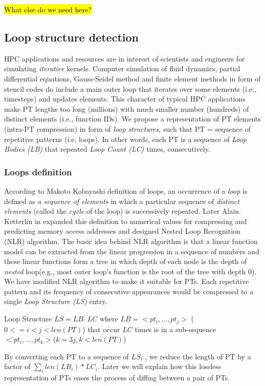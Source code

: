 \hl{What else do we need here?}

\subsection{Loop structure detection}
\label{subsec:nlr}

HPC applications and resources are in interest of scientists and engineers for simulating \textit{iterative} kernels. Computer simulation of fluid dynamics, partial differential equations, Gauss-Seidel method and finite element methods in form of stencil codes do include a main outer loop that iterates over some elements (i.e., timesteps) and updates elements.
%
This character of typical HPC applications make PT lengths too long (millions) with much smaller number (hundreds) of distinct elements  (i.e., function IDs).
%
We propose a representation of PT elements (intra-PT compression) in form of \textit{loop structures}, such that PT = sequence of repetitive patterns (i.e, loops). In other words, each PT is a sequence of \textit{Loop Bodies (LB)} that repeated \textit{Loop Count (LC)} times, consecutively.
%


\subsubsection{Loops definition}

According to Makoto Kobayashi\cite{kobayashi-84} definition of loops, an occurrence of a \textit{loop} is defined as \textit{a sequence of elements} in which a particular sequence of \textit{distinct elements} (called the \textit{cycle} of the loop) is successively repeated.
%
Later Alain Ketterlin in \cite{Ketterlin-nlr} expanded this definition to numerical values for compressing and predicting memory access addresses and designed Nested Loop Recognition (NLR) algorithm.
%
The basic idea behind NLR algorithm is that a linear function model can be extracted from the linear progression in a sequence of numbers and these linear functions form a tree in which depth of each node is the depth of \textit{nested} loop(e.g., most outer loop's function is the root of the tree with depth 0).
%
We have modified NLR algorithm to make it suitable for PTs.
%
Each repetitive pattern and its frequency of consecutive appearances would be compressed to a single \textit{Loop Structure (LS)} entry.
%
\begin{definition}{Loop Structure} $LS = LB \; \hat{} \; LC$ where $LB  = <pt_i,...,pt_j>$ ($0<= i < j < len(PT)$) that occur $LC$ times is in a sub-sequence $ <pt_i,...,pt_k>$($k = 3j, k<len(PT)$)

\end{definition}
%
By converting each PT to a sequence of $LS_i$ , we reduce the length of PT by a factor of $\sum_i len(LB_i) * LC_i$.
%
Later we will explain how this lossless representation of PTs eases the process of diffing between a pair of PTs.

